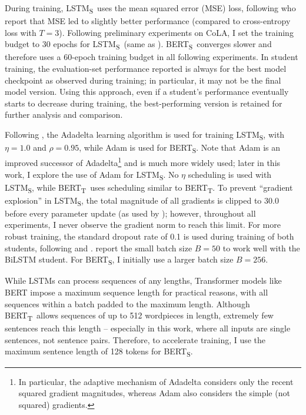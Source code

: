 \documentclass[bsc,frontabs,singlespacing,parskip,deptreport]{infthesis}
\def\BERTT{BERT\textsubscript{T}}
\def\BERTS{BERT\textsubscript{S}}
\def\LSTMS{LSTM\textsubscript{S}}
\begin{document}
{{{      During training, \LSTMS~uses the mean squared error (MSE) loss, following \citeauthor{Tang_2019b} who report that MSE led to slightly better performance (compared to cross-entropy loss with $T=3$). Following preliminary experiments on CoLA, I set the training budget to 30 epochs for \LSTMS~(same as \citeauthor{Tang_2019b}). \BERTS~converges slower and therefore uses a 60-epoch training budget in all following experiments. In student training, the evaluation-set performance reported is always for the best model checkpoint as observed during training; in particular, it may not be the final model version.
      Using this approach, even if a student's performance eventually starts to decrease during training, the best-performing version is retained for further analysis and comparison.

      Following \citeauthor{Tang_2019b}, the Adadelta learning algorithm \citep{Zeiler_2012} is used for training \LSTMS, with $\eta=1.0$ and $\rho=0.95$, while Adam is used for \BERTS.
      Note that Adam is an improved successor of Adadelta\footnote{In particular, the adaptive mechanism of Adadelta considers only the recent squared gradient magnitudes, whereas Adam also considers the simple (not squared) gradients.} and is much more widely used; later in this work, I explore the use of Adam for \LSTMS. No $\eta$ scheduling is used with \LSTMS, while \BERTT~uses scheduling similar to \BERTT.
      To prevent ``gradient explosion'' in \LSTMS, the total magnitude of all gradients is clipped to 30.0 before every parameter update (as used by \citeauthor{Tang_2019b}); however, throughout all experiments, I never observe the gradient norm to reach this limit.
      For more robust training, the standard dropout rate of 0.1 is used during training of both students, following \citet{Devlin_2018} and \citeauthor{Tang_2019b}.
      \citeauthor{Tang_2019b} report the small batch size $B=50$ to work well with the BiLSTM student. For \BERTS, I initially use a larger batch size $B=256$.

      While LSTMs can process sequences of any lengths, Transformer models like BERT impose a maximum sequence length for practical reasons, with all sequences within a batch padded to the maximum length. Although \BERTT~allows sequences of up to 512 wordpieces in length, extremely few sentences reach this length -- especially in this work, where all inputs are single sentences, not sentence pairs. Therefore, to accelerate training, I use the maximum sentence length of 128 tokens for \BERTS.

}}}
\end{document}
